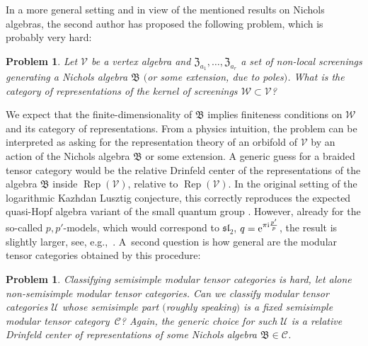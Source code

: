 \documentclass[10pt,a4paper]{amsart}
\numberwithin{equation}{section}
\newtheorem{prob}[teo]{Problem}
\newcommand{\zem}{\mathfrak{Z}}
\begin{document}
In a more general setting and in view of the mentioned results on Nichols algebras, the second author has proposed the following problem, which is probably very hard:
\begin{prob} Let $\mathcal{V}$ be a vertex algebra and $\zem_{a_1},\dots,\zem_{a_r}$ a set of non-local screenings generating a Nichols algebra $\mathfrak{B}$ $($or some extension, due to poles$)$. What is the category of representations of the kernel of screenings $\mathcal{W}\subset\mathcal{V}$?
\end{prob}

We expect that the finite-dimensionality of $\mathfrak{B}$ implies finiteness conditions on $\mathcal{W}$ and its category of representations. From a physics intuition, the problem can be interpreted as asking for the representation theory of an orbifold of $\mathcal{V}$ by an action of the Nichols algebra $\mathfrak{B}$ or some extension. A generic guess for a braided tensor category would be the relative Drinfeld center of the representations of the algebra $\mathfrak{B}$ inside $\operatorname{Rep}(\mathcal{V})$, relative to $\operatorname{Rep}(\mathcal{V})$. In the original setting of the logarithmic Kazhdan Lusztig conjecture, this correctly reproduces the expected quasi-Hopf algebra variant of the small quantum group \cite{CGR20,GLO18, Ne21}. However, already for the so-called $p,p'$-models, which would correspond to $\mathfrak{sl}_2$, $q={\rm e}^{\pi {\rm i}\frac{p'}{p}}$, the result is slightly larger, see, e.g.,~\cite{GRW09}. A~second question is how general are the modular tensor categories obtained by this procedure:

\begin{prob}
Classifying semisimple modular tensor categories is hard, let alone non-semi\-simple modular tensor categories. Can we classify modular tensor categories $\mathcal{U}$ whose semisimple part $($roughly speaking$)$ is a fixed semisimple modular tensor category~$\mathcal{C}$? Again, the generic choice for such $\mathcal{U}$ is a relative Drinfeld center of representations of some Nichols algebra $\mathfrak{B}\in\mathcal{C}$.
\end{prob}
\end{document}
